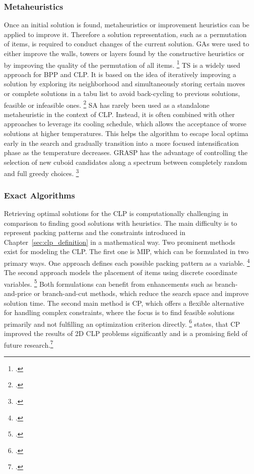 \subsubsection{Metaheuristics}
Once an initial solution is found, metaheuristics or improvement heuristics can be applied
to improve it. Therefore a solution representation, such as a permutation of items, is required
to conduct changes of the current solution. \gls{GA}s were
used to either improve the walls, towers or layers found by the constructive heuristics
or by improving the quality of the permutation of all items. \footcite[cf.][]{gehring_genetic_1997}
\gls{TS} is a widely used approach for \gls{BPP} and \gls{CLP}. It is based on
the idea of iteratively improving a solution by exploring its neighborhood and simultaneously
storing certain moves or complete solutions in a tabu list to avoid back-cycling to
previous solutions, feasible or infeasible ones. \footcite[cf.][pp. 344--345]{gendreau_tabu_2006} \gls{SA} has rarely been used as a
standalone metaheuristic in the context of \gls{CLP}. Instead, it is often combined
with other approaches to leverage its cooling schedule, which allows the acceptance of
worse solutions at higher temperatures. This helps the algorithm to escape local optima
early in the search and gradually transition into a more focused intensification phase as
the temperature decreases. \gls{GRASP} has the advantage of controlling the selection of new
cuboid candidates along a spectrum between completely random and full greedy choices. \footcite[cf.][]{moura_grasp_2005}

\subsubsection{Exact Algorithms}
Retrieving optimal solutions for the \gls{CLP} is computationally challenging in comparison
to finding good solutions with heuristics. The main difficulty is to represent packing
patterns and the constraints introduced in Chapter~\ref{sec:clp_definition} in a mathematical way.
Two prominent methods exist for modeling the \gls{CLP}. The first one is \gls{MIP}, which can be
formulated in two primary ways. One approach defines each possible packing pattern as
a variable. \footcite[cf.][pp. 29--30]{zhu_prototype_2012} The second approach models
the placement of items using discrete coordinate variables. \footcite[cf.][pp. 4--8]{moura_integrated_2009}
Both formulations can benefit from enhancements such as branch-and-price or branch-and-cut
methods, which reduce the search space and improve solution time.
The second main method is \gls{CP}, which offers a flexible alternative for handling
complex constraints, where the focus is to find feasible solutions primarily and
not fulfilling an optimization criterion directly. \footcites[cf.][pp. 5--8]{kucuk_constraint_2022}[cf.][pp. 7--11]{tamke_branch-and-cut_2024} \textcite{iori_exact_2021} states, that
\gls{CP} improved the results of 2D \gls{CLP} problems significantly and is a promising
field of future research.\footcite[cf.][p. 23]{iori_exact_2021}

